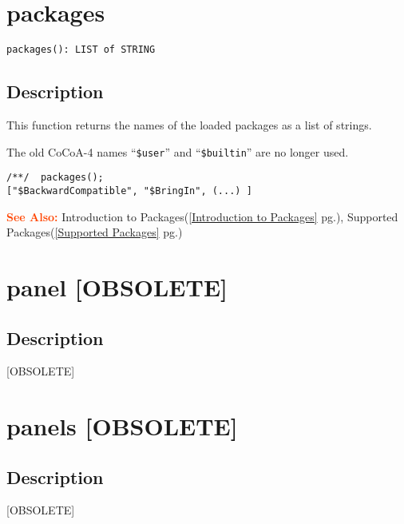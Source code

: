 \documentclass[a4paper]{mybook}
\newenvironment{command}{}{} %
\newcommand\SeeAlso{\par\textcolor{OrangeRed}{\textbf{\large See Also: }}}
\begin{document}
\section{packages}
\label{packages}
\begin{command} %


\begin{Verbatim}[label=syntax, rulecolor=\color{MidnightBlue},
frame=single]
packages(): LIST of STRING
\end{Verbatim}


\subsection*{Description}

This function returns the names of the loaded packages as a list of
strings.
\par 
The old CoCoA-4 names ``\verb&$user&'' and ``\verb&$builtin&'' are no
longer used.
\begin{Verbatim}[label=example, rulecolor=\color{PineGreen}, frame=single]
/**/  packages();
["$BackwardCompatible", "$BringIn", (...) ]
\end{Verbatim}


\SeeAlso %
  Introduction to Packages(\ref{Introduction to Packages} pg.\pageref{Introduction to Packages}), 
    Supported Packages(\ref{Supported Packages} pg.\pageref{Supported Packages})
\end{command} %

\section{panel [OBSOLETE]}
\label{panel [OBSOLETE]}
\begin{command} %



\subsection*{Description}

[OBSOLETE]

\end{command} %

\section{panels [OBSOLETE]}
\label{panels [OBSOLETE]}
\begin{command} %



\subsection*{Description}

[OBSOLETE]

\end{command} %
\end{document}
